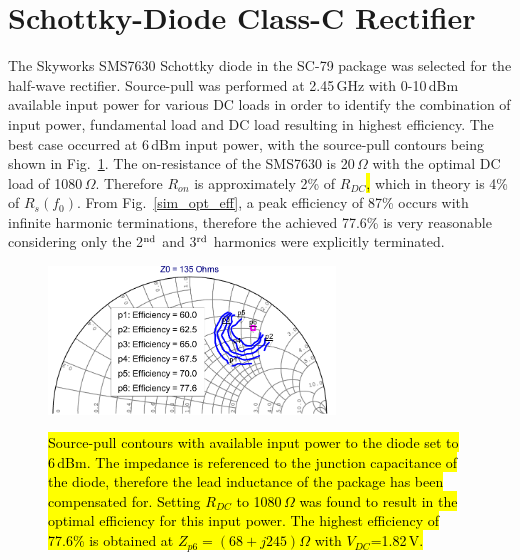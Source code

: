 \section{Schottky-Diode Class-C Rectifier}

The Skyworks SMS7630 Schottky diode in the SC-79 package was selected for the half-wave rectifier. Source-pull was performed at 2.45\,GHz with 0-10\,dBm available input power for various DC loads in order to identify the combination of input power, fundamental load and DC load resulting in highest efficiency.  The best case occurred at 6\,dBm input power, with the source-pull contours being shown in Fig.~\ref{lpcontours}.  The on-resistance of the SMS7630 is 20\,$\Omega$ with the optimal DC load of 1080\,$\Omega$. Therefore $R_{on}$ is approximately 2\% of $R_{DC}$\hl{,} which in theory is 4\% of $R_s(f_0)$.  From Fig.~\ref{sim_opt_eff}, a peak efficiency of 87\% occurs with infinite harmonic terminations, therefore the achieved 77.6\% is very reasonable considering only the 2$^{\rm nd}$ and 3$^{\rm rd}$ harmonics were explicitly terminated.



\begin{figure}
  \begin{center}
  \includegraphics[width=3.0in]{pdf/06.pdf}\\
 \caption{\hl{Source-pull contours with available input power to the diode set to 6\,dBm.  The impedance is referenced to the junction capacitance of the diode, therefore the lead inductance of the package has been compensated for. Setting $R_{DC}$ to 1080\,$\Omega$ was found to result in the optimal efficiency for this input power. The highest efficiency of 77.6\% is obtained at $Z_{p6}=(68+j245)\Omega$ with $V_{DC}$=1.82\,V.}}\label{lpcontours}
  \end{center}
\end{figure}



